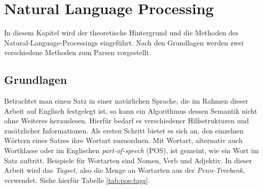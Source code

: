 %
\chapter{Natural Language Processing}
\label{sec:nlp}
In diesem Kapitel wird der theoretische Hintergrund und die Methoden des Natural-Language-Processings eingeführt. Nach den Grundlagen werden zwei verschiedene Methoden zum Parsen vorgestellt. 

\section{Grundlagen}
\label{sec:nlp:grundlagen}

Betrachtet man einen Satz in einer natürlichen Sprache, die im Rahmen dieser Arbeit auf Englisch festgelegt ist, so kann ein Algorithmus dessen Semantik nicht ohne Weiteres herauslesen. Hierfür bedarf es verschiedener Hilfsstrukturen und zusätzlicher Informationen. Als ersten Schritt bietet es sich an, den einzelnen Wörtern eines Satzes ihre Wortart zuzuordnen. Mit Wortart, alternativ auch Wortklasse oder im Englischen \textit{part-of-speech} (POS), ist gemeint, wie ein Wort im Satz auftritt. Beispiele für Wortarten sind Nomen, Verb und Adjektiv. In dieser Arbeit wird das \textit{Tagset}, also die Menge an Wortarten aus der \textit{Penn-Treebank}, verwendet. Siehe hierfür Tabelle \ref{tab:pos-tags}.

